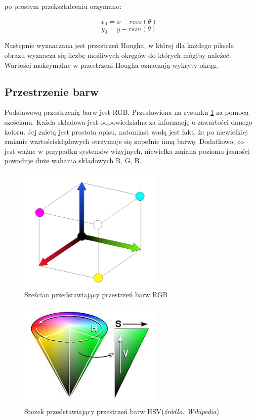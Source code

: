 po prostym przekształceniu orzymano:

\begin{equation}
x_0 = x - rcos(\theta)
\end{equation}
\begin{equation}
y_0 = y - rsin(\theta)
\end{equation}

Następnie wyznaczana jest przestrzeń Hougha, w której dla każdego piksela obrazu wyznacza się liczbę możliwych okręgów do których mógłby należeć. Wartości maksymalne w przestrzeni Hougha oznaczają wykryty okrąg.

\subsection{Przestrzenie barw}

Podstawową przestrzenią barw jest RGB. Przestawiona na rysunku \ref{fig:rgb} za pomocą sześcianu. Każda składowa jest odpowiedzialna za informację o zawartości danego koloru. Jej zaletą jest prostota opisu, natomiast wadą jest fakt, że po niewielkiej zmianie wartościskłądowych otrzymuje się zupełnie inną barwę. Dodatkowo, co jest ważne w przypadku systemów wizyjnych, niewielka zmiana poziomu jasności powoduje duże wahania składowych R, G, B.

\begin{figure}
  \centering
  \includegraphics[width=7cm]{img/rgb.jpg}
  \caption{Sześcian przedstawiający przestrzeń barw RGB\cite{W4}}
  \label{fig:rgb}
\end{figure}


\begin{figure}
  \centering
  \includegraphics[width=7cm]{img/hsv.jpg}
  \caption{Stożek przedstawiający przestrzeń barw HSV(\textit{źródło: Wikipedia})}
  \label{fig:hsv}
\end{figure}

